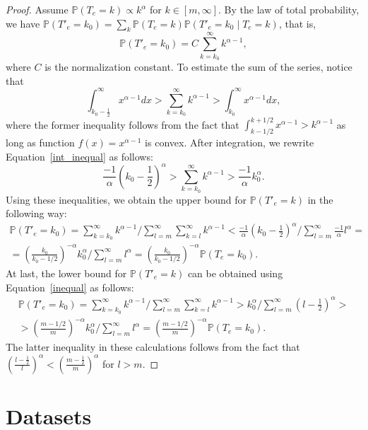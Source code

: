 \documentclass{article}
\renewcommand{\P}{\mathbb{P}}
\begin{document}
\begin{proof}
Assume $\P(T_e=k)\propto k^{\alpha}$ for $k\in [m,\infty]$. By the law of total probability, we have $\P(T'_e=k_0)= \sum_{k}\P(T_e=k)\P(T'_e=k_0\mid T_e=k)$, that is,
$$
\P(T'_e=k_0) = C \sum_{k=k_0}^{\infty} k^{\alpha-1},
$$
where $C$ is the normalization constant. To estimate the sum of the series, notice that
\begin{equation}\label{int_inequal}
\int_{k_0-\frac{1}{2}}^\infty x^{\alpha-1} dx > \sum_{k=k_0}^{\infty} k^{\alpha-1} > \int_{k_0}^\infty x^{\alpha-1} dx,    
\end{equation}
where the former inequality follows from the fact that $\int_{k-1/2}^{k+1/2} x^{\alpha-1}> k^{\alpha-1}$ as long as function $f(x)=x^{\alpha-1}$ is convex. After integration, we rewrite Equation~\ref{int_inequal} as follows:
\begin{equation}\label{inequal}
\frac{-1}{\alpha} \left ( k_0-\frac{1}{2}\right )^{\alpha} > \sum_{k=k_0}^{\infty} k^{\alpha-1} > \frac{-1}{\alpha} k_0^{\alpha}. \end{equation}
Using these inequalities, we obtain the upper bound for $\P(T'_e=k)%
$ in the following way:
\begin{multline*}
\P(T'_e=k_0) = \sum_{k=k_0}^{\infty} k^{\alpha-1} / \sum_{l=m}^\infty \sum_{k=l}^{\infty} k^{\alpha-1} < \frac{-1}{\alpha} \left ( k_0-\frac{1}{2}\right )^{\alpha} / \sum_{l=m}^\infty \frac{-1}{\alpha} l^{\alpha} = \\
=\left (\frac{k_0}{k_0-1/2}\right )^{-\alpha} k_0^\alpha/\sum_{l=m}^\infty l^{\alpha} = \left (\frac{k_0}{k_0-1/2}\right )^{-\alpha} \P(T_e=k_0).
\end{multline*}
At last, the lower bound for $\P(T'_e=k)%
$ can be obtained using Equation~\ref{inequal} as follows:
\begin{multline*}
\P(T'_e=k_0) = \sum_{k=k_0}^{\infty} k^{\alpha-1} / \sum_{l=m}^\infty \sum_{k=l}^{\infty} k^{\alpha-1} > k_0^{\alpha} / \sum_{l=m}^\infty  \left (l-\frac{1}{2}\right )^{\alpha} > \\
> \left (\frac{m-1/2}{m}\right )^{-\alpha} k_0^\alpha/\sum_{l=m}^\infty l^{\alpha} = \left (\frac{m-1/2}{m}\right )^{-\alpha} \P(T_e=k_0).
\end{multline*}
The latter inequality in these calculations follows from the fact that $\left (\frac{l-\frac{1}{2}}{l}\right )^{\alpha}<\left (\frac{m-\frac{1}{2}}{m}\right )^{\alpha}$ for $l>m$.

\end{proof}

\section{Datasets} \label{app-sec-datasets}
\end{document}
